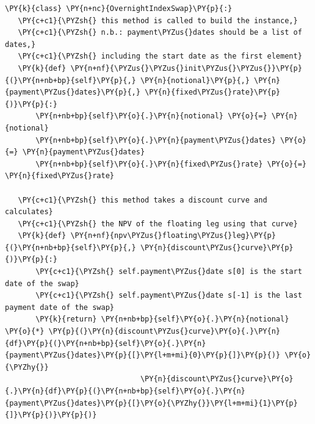 \begin{Verbatim}[commandchars=\\\{\}]
\PY{k}{class} \PY{n+nc}{OvernightIndexSwap}\PY{p}{:}        
   \PY{c+c1}{\PYZsh{} this method is called to build the instance,}
   \PY{c+c1}{\PYZsh{} n.b.: payment\PYZus{}dates should be a list of dates,}
   \PY{c+c1}{\PYZsh{} including the start date as the first element}
   \PY{k}{def} \PY{n+nf}{\PYZus{}\PYZus{}init\PYZus{}\PYZus{}}\PY{p}{(}\PY{n+nb+bp}{self}\PY{p}{,} \PY{n}{notional}\PY{p}{,} \PY{n}{payment\PYZus{}dates}\PY{p}{,} \PY{n}{fixed\PYZus{}rate}\PY{p}{)}\PY{p}{:}
       \PY{n+nb+bp}{self}\PY{o}{.}\PY{n}{notional} \PY{o}{=} \PY{n}{notional}
       \PY{n+nb+bp}{self}\PY{o}{.}\PY{n}{payment\PYZus{}dates} \PY{o}{=} \PY{n}{payment\PYZus{}dates}
       \PY{n+nb+bp}{self}\PY{o}{.}\PY{n}{fixed\PYZus{}rate} \PY{o}{=} \PY{n}{fixed\PYZus{}rate}
       
   \PY{c+c1}{\PYZsh{} this method takes a discount curve and calculates}
   \PY{c+c1}{\PYZsh{} the NPV of the floating leg using that curve}
   \PY{k}{def} \PY{n+nf}{npv\PYZus{}floating\PYZus{}leg}\PY{p}{(}\PY{n+nb+bp}{self}\PY{p}{,} \PY{n}{discount\PYZus{}curve}\PY{p}{)}\PY{p}{:}
       \PY{c+c1}{\PYZsh{} self.payment\PYZus{}date s[0] is the start date of the swap}
       \PY{c+c1}{\PYZsh{} self.payment\PYZus{}date s[-1] is the last payment date of the swap}
       \PY{k}{return} \PY{n+nb+bp}{self}\PY{o}{.}\PY{n}{notional} \PY{o}{*} \PY{p}{(}\PY{n}{discount\PYZus{}curve}\PY{o}{.}\PY{n}{df}\PY{p}{(}\PY{n+nb+bp}{self}\PY{o}{.}\PY{n}{payment\PYZus{}dates}\PY{p}{[}\PY{l+m+mi}{0}\PY{p}{]}\PY{p}{)} \PY{o}{\PYZhy{}} 
                               \PY{n}{discount\PYZus{}curve}\PY{o}{.}\PY{n}{df}\PY{p}{(}\PY{n+nb+bp}{self}\PY{o}{.}\PY{n}{payment\PYZus{}dates}\PY{p}{[}\PY{o}{\PYZhy{}}\PY{l+m+mi}{1}\PY{p}{]}\PY{p}{)}\PY{p}{)}
   

\end{Verbatim}

